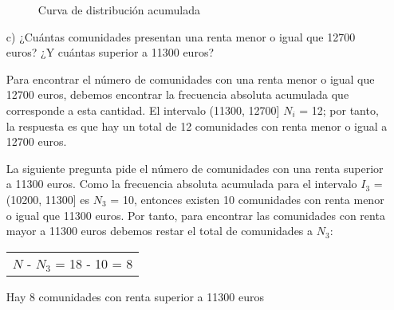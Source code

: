 \documentclass[a4paper,12pt]{article}
\begin{document}
\begin{itemize}
\begin{figure}[H]
    \centering
    \caption{Curva de distribución acumulada}
\end{figure}


    \item[c)] ¿Cuántas comunidades presentan una renta menor o igual que 12700 euros? ¿Y cuántas superior a 11300 euros?
    
    Para encontrar el número de comunidades con una renta menor o igual que 12700 euros, debemos encontrar la frecuencia absoluta acumulada que corresponde a esta cantidad. El intervalo (11300, 12700] $N_i$ = 12; por tanto, la respuesta es que hay un total de 12 comunidades con renta menor o igual a 12700 euros.

    La siguiente pregunta pide el número de comunidades con una renta superior a 11300 euros. Como la frecuencia absoluta acumulada para el intervalo $I_3$ = (10200, 11300] es $N_3$ = 10, entonces existen 10 comunidades con renta menor o igual que 11300 euros. Por tanto, para encontrar las comunidades con renta mayor a  11300 euros debemos restar el total de comunidades a $N_3$:
\begin {center}
    \begin{tabular}{}
   $N$ - $N_3$ = 18 - 10 = 8
    \end{tabular}
\end {center} 
    Hay 8 comunidades con renta superior a 11300 euros
    
\end{itemize}
\end{document}

